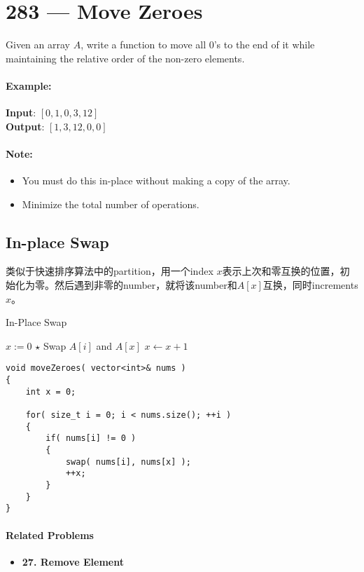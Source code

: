 \section{283 --- Move Zeroes}
Given an array $A$, write a function to move all 0's to the end of it while maintaining the relative order of the non-zero elements.

\paragraph{Example:}

\begin{flushleft}
\textbf{Input}: $[0,1,0,3,12]$
\\
\textbf{Output}: $[1,3,12,0,0]$
\end{flushleft}

\paragraph{Note:}

\begin{itemize}
\item You must do this in-place without making a copy of the array.
\item Minimize the total number of operations.
\end{itemize}
\subsection{In-place Swap}
类似于快速排序算法中的partition，用一个index $x$表示上次和零互换的位置，初始化为零。然后遇到非零的number，就将该number和$A[x]$互换，同时increments $x$。
\setcounter{algorithm}{0}
\begin{algorithm}[H]
\caption{In-Place Swap}
\begin{algorithmic}[1]
\State $x:=0$
\State $\star$ Swap $A[i]$ and $A[x]$
\State $x\gets x+1$
\EndIf
\EndFor
\EndProcedure
\end{algorithmic}
\end{algorithm}
\setcounter{lstlisting}{0}
\begin{lstlisting}[style=customc,caption={In-Place Swap}]
void moveZeroes( vector<int>& nums )
{
    int x = 0;

    for( size_t i = 0; i < nums.size(); ++i )
    {
        if( nums[i] != 0 )
        {
            swap( nums[i], nums[x] );
            ++x;
        }
    }
}
\end{lstlisting}

\paragraph{Related Problems}
\begin{itemize}
\item \textbf{27. Remove Element}
\end{itemize}
